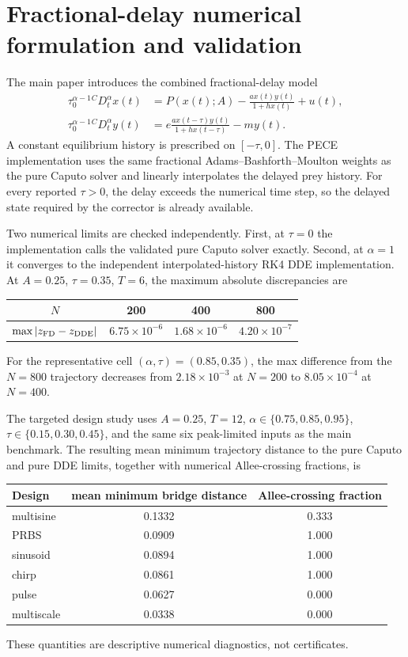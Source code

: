 \section{Fractional-delay numerical formulation and validation}
\label{ssec:fdval}

The main paper introduces the combined fractional-delay model
\begin{align*}
\tau_0^{\alpha-1}{}^CD_t^\alpha x(t)
&=P(x(t);A)-\frac{a x(t)y(t)}{1+h x(t)}+u(t),\\
\tau_0^{\alpha-1}{}^CD_t^\alpha y(t)
&=e\frac{a x(t-\tau)y(t)}{1+h x(t-\tau)}-m y(t).
\end{align*}
A constant equilibrium history is prescribed on $[-\tau,0]$. The PECE implementation uses the same fractional Adams--Bashforth--Moulton weights as the pure Caputo solver and linearly interpolates the delayed prey history. For every reported $\tau>0$, the delay exceeds the numerical time step, so the delayed state required by the corrector is already available.

Two numerical limits are checked independently. First, at $\tau=0$ the implementation calls the validated pure Caputo solver exactly. Second, at $\alpha=1$ it converges to the independent interpolated-history RK4 DDE implementation. At $A=0.25$, $\tau=0.35$, $T=6$, the maximum absolute discrepancies are
\begin{center}
\begin{tabular}{c|ccc}
$N$ & 200 & 400 & 800\\\hline
$\max|z_{\rm FD}-z_{\rm DDE}|$ & $6.75\times10^{-6}$ & $1.68\times10^{-6}$ & $4.20\times10^{-7}$
\end{tabular}
\end{center}
For the representative cell $(\alpha,\tau)=(0.85,0.35)$, the max difference from the $N=800$ trajectory decreases from $2.18\times10^{-3}$ at $N=200$ to $8.05\times10^{-4}$ at $N=400$.

The targeted design study uses $A=0.25$, $T=12$, $\alpha\in\{0.75,0.85,0.95\}$, $\tau\in\{0.15,0.30,0.45\}$, and the same six peak-limited inputs as the main benchmark. The resulting mean minimum trajectory distance to the pure Caputo and pure DDE limits, together with numerical Allee-crossing fractions, is
\begin{center}
\begin{tabular}{lcc}
Design & mean minimum bridge distance & Allee-crossing fraction\\\hline
multisine & 0.1332 & 0.333\\
PRBS & 0.0909 & 1.000\\
sinusoid & 0.0894 & 1.000\\
chirp & 0.0861 & 1.000\\
pulse & 0.0627 & 0.000\\
multiscale & 0.0338 & 0.000
\end{tabular}
\end{center}
These quantities are descriptive numerical diagnostics, not certificates.
